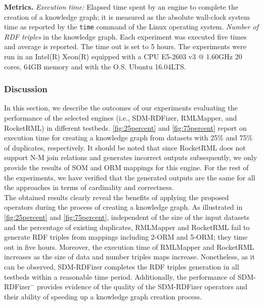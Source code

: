 \noindent\textbf{Metrics.} \textit{Execution time:} Elapsed time spent by an engine to complete the creation of a knowledge graph; it is measured as the absolute wall-clock system time as reported by the \verb|time| command of the Linux operating system. \textit{Number of RDF triples} in the knowledge graph. Each experiment was executed five times and average is reported. The time out is set to 5 hours. The experiments were run in an Intel(R) Xeon(R) equipped with a CPU E5-2603 v3 @ 1.60GHz 20 cores, 64GB memory and with the O.S. Ubuntu 16.04LTS.

\subsubsection{Discussion}
In this section, we describe the outcomes of our experiments evaluating the performance of the selected engines (i.e., SDM-RDFizer, RMLMapper, and RocketRML) in different testbeds.
\autoref{fig:25percent} and \autoref{fig:75percent} report on execution time for creating a knowledge graph from datasets with 25\% and 75\% of duplicates, respectively. It should be noted that since RocketRML does not support N-M join relations and generates incorrect outputs subsequently, we only provide the results of SOM and ORM mappings for this engine. For the rest of the experiments, we have verified that the generated outputs are the same for all the approaches in terms of cardinality and correctness.\\
\noindent The obtained results clearly reveal the benefits of applying the proposed operators during the process of creating a knowledge graph. As illustrated in \autoref{fig:25percent} and \autoref{fig:75percent}, independent of the size of the input datasets and the percentage of existing duplicates, RMLMapper and RocketRML fail to generate RDF triples from mappings including 2-ORM and 5-ORM; they time out in five hours. Moreover, the execution time of RMLMapper and RocketRML increases as the size of data and number triples maps increase. Nonetheless, as it can be observed, SDM-RDFizer completes the RDF triples generation in all testbeds within a reasonable time period. Additionally, the performance of SDM-RDFizer$^-$ provides evidence of the quality of the SDM-RDFizer operators and their ability of speeding up a knowledge graph creation process.       
